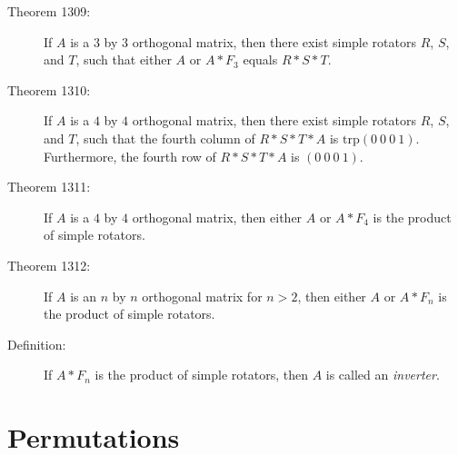 \documentclass{article}
\begin{document}
\begin{description}
  \item[Theorem 1309:] If $A$ is a $3$ by $3$ orthogonal matrix, then there exist simple rotators $R$, $S$, and $T$, such that either $A$ or $A*F_{3}$ equals $R*S*T$.

  \item[Theorem 1310:] If $A$ is a $4$ by $4$ orthogonal matrix, then there exist simple rotators $R$, $S$, and $T$, such that the fourth column of $R*S*T*A$ is $\text{trp} (0\ 0\ 0\ 1)$. Furthermore, the fourth row of $R*S*T*A$ is $(0\ 0\ 0\ 1)$.

  \item[Theorem 1311:] If $A$ is a $4$ by $4$ orthogonal matrix, then either $A$ or $A*F_{4}$ is the product of simple rotators.

  \item[Theorem 1312:] If $A$ is an $n$ by $n$ orthogonal matrix for $n > 2$, then either $A$ or $A*F_{n}$ is the product of simple rotators.

  \item[Definition:] If $A*F_{n}$ is the product of simple rotators, then $A$ is called an \emph{inverter}.

\end{description}


\section{Permutations}
\end{document}
